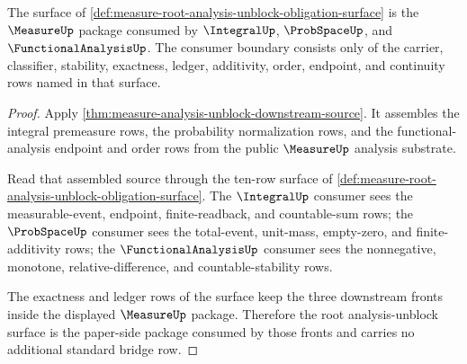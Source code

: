 \begin{theorem}
\label{thm:measure-root-analysis-unblock-downstream-package}
The surface of
\autoref{def:measure-root-analysis-unblock-obligation-surface} is the
$\MeasureUp$ package consumed by $\IntegralUp$, $\ProbSpaceUp$, and
$\FunctionalAnalysisUp$. The consumer boundary consists only of the carrier,
classifier, stability, exactness, ledger, additivity, order, endpoint, and
continuity rows named in that surface.
\end{theorem}
\begin{proof}
Apply \autoref{thm:measure-analysis-unblock-downstream-source}. It assembles
the integral premeasure rows, the probability normalization rows, and the
functional-analysis endpoint and order rows from the public $\MeasureUp$
analysis substrate.

Read that assembled source through the ten-row surface of
\autoref{def:measure-root-analysis-unblock-obligation-surface}. The
$\IntegralUp$ consumer sees the measurable-event, endpoint, finite-readback,
and countable-sum rows; the $\ProbSpaceUp$ consumer sees the total-event,
unit-mass, empty-zero, and finite-additivity rows; the
$\FunctionalAnalysisUp$ consumer sees the nonnegative, monotone,
relative-difference, and countable-stability rows.

The exactness and ledger rows of the surface keep the three downstream fronts
inside the displayed $\MeasureUp$ package. Therefore the root
analysis-unblock surface is the paper-side package consumed by those fronts
and carries no additional standard bridge row.
\end{proof}
